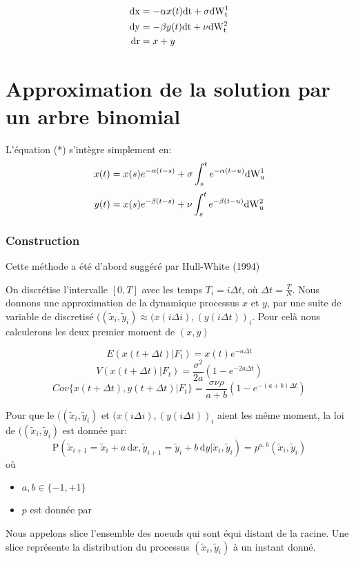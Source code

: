 \documentclass[paper=a4, fontsize=11pt]{scrartcl}
\numberwithin{equation}{section}		%
\numberwithin{figure}{section}			%
\numberwithin{table}{section}				%
\theoremstyle{definition}
\begin{document}
\begin{align*}
  \rm{d}x &= -\alpha x(t) \rm{d}t + \sigma \rm{d}W^1_t \\
  \rm{d}y &= -\beta y(t) \rm{d}t + \nu \rm{d}W^2_t \\
  \rm{d}r &= x + y 
\end{align*}

\newpage
\section{Approximation de la solution par un arbre binomial}


L'équation (*) s'intègre simplement en:
$$x(t) = x(s) e^{-\alpha (t-s)} +  \sigma \int_s^t e^{- \alpha (t-u)} \rm{d} W^1_u $$
$$y(t) = x(s) e^{-\beta (t-s)} +  \nu \int_s^t e^{- \beta (t-u)} \rm{d} W^2_u $$

\subsubsection{Construction}

Cette méthode a été d'abord suggéré par Hull-White (1994)

On discrétise l’intervalle $[0, T]$ avec les temps $T_i = i \Delta t$, où $\Delta t = \frac{T}{N}$.
Nous donnons une approximation de la dynamique processus $x$ et $y$, par une suite de variable de discretisé $((\widetilde{x}_i, \widetilde{y}_i) \approx (x(i \Delta i), (y(i \Delta t))_i $. Pour celà nous calculerons les deux premier moment de $(x, y)$

$$E(x(t+\Delta t) | F_t) = x(t) e^{-a \Delta t}$$
$$V(x(t+\Delta t) | F_t) = \frac{\sigma^2}{2a} (1 - e^{-2a \Delta t})$$
$$Cov\{x(t+\Delta t), y(t+\Delta t) | F_t \} = \frac{\sigma \nu \rho}{a + b} (1-e^{-(a+b)\Delta t})$$

Pour que le $((\widetilde{x}_i, \widetilde{y}_i)$ et $(x(i \Delta i), (y(i \Delta t))_i $ aient les même moment, la loi de  $((\widetilde{x}_i, \widetilde{y}_i)$  est donnée par:
$$\mathrm{P} \left( \widetilde{x}_{i+1} = \widetilde{x}_i + a \, \mathrm{d}x, \widetilde{y}_{i+1} = \widetilde{y}_i + b \, \mathrm{d}y |  \widetilde{x}_i, \widetilde{y}_i \right) = p^{a, b}( \widetilde{x}_i, \widetilde{y}_i)$$
où 
\begin{itemize}
\item $a, b \in \{-1, +1\}$
\item $p$ est donnée par
\end{itemize}

Nous appelons slice l'ensemble des noeuds qui sont équi distant de la racine. Une slice représente la distribution du processus $( \widetilde{x}_i, \widetilde{y}_i)$ à un instant donné.
\end{document}
